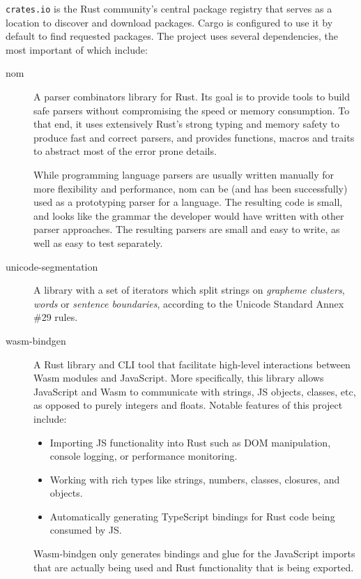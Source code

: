 \documentclass[english,engineering]{wizthesis}
\newcommand{\paraphrase}[1]{#1}
\begin{document}
\texttt{crates.io} \paraphrase{is the Rust community's central package registry
that serves as a location to discover and download packages. Cargo is configured
to use it by default to find requested packages.} The project uses several
dependencies, the most important of which include:
\begin{description}
  \item[nom] \cite{nom,couprie-2015} \paraphrase{A parser combinators library for Rust. Its
  goal is to provide tools to build safe parsers without compromising the speed
  or memory consumption. To that end, it uses extensively Rust's strong typing
  and memory safety to produce fast and correct parsers, and provides functions,
  macros and traits to abstract most of the error prone details.

  While programming language parsers are usually written manually for more
  flexibility and performance, nom can be (and has been successfully) used as a
  prototyping parser for a language. The resulting code is small, and looks like
  the grammar the developer would have written with other parser approaches. The
  resulting parsers are small and easy to write, as well as easy to test
  separately.}
  \item[unicode-segmentation] \cite{unicode-segmentation} A library with a set
  of iterators which split strings on \emph{grapheme clusters}, \emph{words} or
  \emph{sentence boundaries}, according to the Unicode Standard Annex \#29
  \cite{unicode-standard-annex-29} rules.
  \item[wasm-bindgen] \cite{wasm-bindgen} \paraphrase{A Rust library and CLI
  tool that facilitate high-level interactions between Wasm modules and
  JavaScript. More specifically, this library allows JavaScript and Wasm to
  communicate with strings, JS objects, classes, etc, as opposed to purely
  integers and floats. Notable features of this project include:
  \begin{itemize}
    \item Importing JS functionality into Rust such as DOM manipulation, console
    logging, or performance monitoring.
    \item Working with rich types like strings, numbers, classes, closures, and
    objects.
    \item Automatically generating TypeScript bindings for Rust code being
    consumed by JS.
  \end{itemize}
  Wasm-bindgen only generates bindings and glue for the JavaScript imports that
  are actually being used and Rust functionality that is being exported.}

\end{description}
\end{document}
